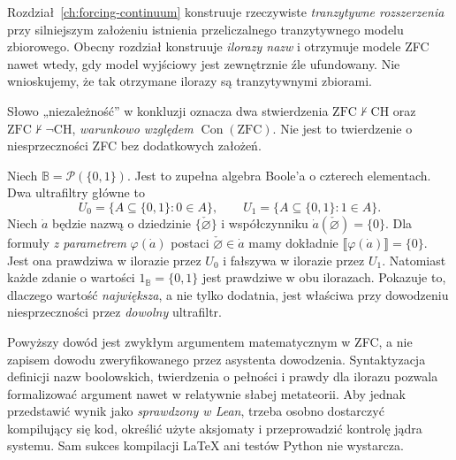 \begin{uwaga}
\label{rem:boolean35-comparison}
Rozdział~\ref{ch:forcing-continuum}
konstruuje rzeczywiste
\emph{tranzytywne rozszerzenia}
przy silniejszym założeniu
istnienia przeliczalnego
tranzytywnego modelu zbiorowego.
Obecny rozdział konstruuje
\emph{ilorazy nazw} i
otrzymuje modele ZFC nawet
wtedy, gdy model wyjściowy
jest zewnętrznie źle
ufundowany. Nie wnioskujemy,
że tak otrzymane ilorazy
są tranzytywnymi zbiorami.

Słowo „niezależność” w
konkluzji oznacza dwa
stwierdzenia
$\mathrm{ZFC}\nvdash\mathrm{CH}$
oraz
$\mathrm{ZFC}\nvdash\neg\mathrm{CH}$,
\emph{warunkowo względem
$\operatorname{Con}(\mathrm{ZFC})$}.
Nie jest to twierdzenie o
niesprzeczności ZFC bez
dodatkowych założeń.
\end{uwaga}

\begin{przyklad}
\label{ex:boolean35-four}
Niech
$\mathbb B=\mathcal P(\{0,1\})$.
Jest to zupełna algebra Boole'a
o czterech elementach.
Dwa ultrafiltry główne to
\[
 U_0=\{A\subseteq\{0,1\}:0\in A\},
 \qquad
 U_1=\{A\subseteq\{0,1\}:1\in A\}.
\]
Niech $\dot a$ będzie nazwą
o dziedzinie $\{\check\varnothing\}$
i współczynniku
$\dot a(\check\varnothing)=\{0\}$.
Dla formuły \emph{z parametrem}
$\varphi(\dot a)$ postaci
$\check\varnothing\in\dot a$
mamy dokładnie
$\llbracket\varphi(\dot a)\rrbracket=\{0\}$.
Jest ona prawdziwa w ilorazie
przez $U_0$ i fałszywa
w ilorazie przez $U_1$.
Natomiast każde zdanie
o wartości $1_{\mathbb B}=\{0,1\}$
jest prawdziwe w obu ilorazach.
Pokazuje to, dlaczego
wartość \emph{największa},
a nie tylko dodatnia, jest
właściwa przy dowodzeniu
niesprzeczności przez
\emph{dowolny} ultrafiltr.
\end{przyklad}

\begin{uwaga}
\label{rem:boolean35-formalization}
Powyższy dowód jest
zwykłym argumentem
matematycznym w ZFC,
a nie zapisem dowodu
zweryfikowanego przez
asystenta dowodzenia.
Syntaktyzacja definicji nazw
boolowskich, twierdzenia o
pełności i prawdy dla ilorazu
pozwala formalizować argument
nawet w relatywnie słabej
metateorii. Aby jednak
przedstawić wynik jako
\emph{sprawdzony w Lean},
trzeba osobno dostarczyć
kompilujący się kod,
określić użyte aksjomaty
i przeprowadzić kontrolę
jądra systemu. Sam sukces
kompilacji LaTeX ani testów
Python nie wystarcza.
\end{uwaga}
